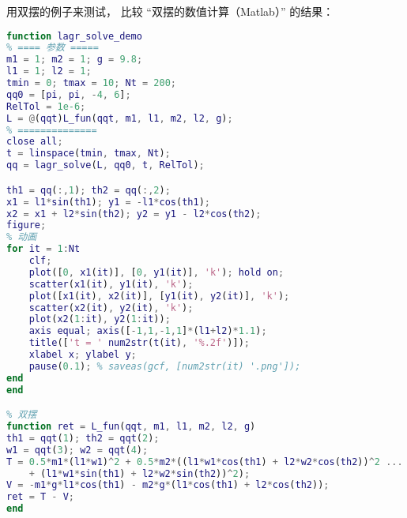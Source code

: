 用双摆的例子来测试， 比较 “双摆的数值计算（Matlab）” 的结果：
\begin{lstlisting}[language=matlab, caption=lagr\_solve\_demo.m]
% lagr_solve_demo
function lagr_solve_demo
% ==== 参数 =====
m1 = 1; m2 = 1; g = 9.8;
l1 = 1; l2 = 1;
tmin = 0; tmax = 10; Nt = 200;
qq0 = [pi, pi, -4, 6];
RelTol = 1e-6;
L = @(qqt)L_fun(qqt, m1, l1, m2, l2, g);
% ==============
close all;
t = linspace(tmin, tmax, Nt);
qq = lagr_solve(L, qq0, t, RelTol);

th1 = qq(:,1); th2 = qq(:,2);
x1 = l1*sin(th1); y1 = -l1*cos(th1);
x2 = x1 + l2*sin(th2); y2 = y1 - l2*cos(th2);
figure;
% 动画
for it = 1:Nt
    clf;
    plot([0, x1(it)], [0, y1(it)], 'k'); hold on;
    scatter(x1(it), y1(it), 'k');
    plot([x1(it), x2(it)], [y1(it), y2(it)], 'k');
    scatter(x2(it), y2(it), 'k');
    plot(x2(1:it), y2(1:it));
    axis equal; axis([-1,1,-1,1]*(l1+l2)*1.1);
    title(['t = ' num2str(t(it), '%.2f')]);
    xlabel x; ylabel y;
    pause(0.1); % saveas(gcf, [num2str(it) '.png']);
end
end

% 双摆
function ret = L_fun(qqt, m1, l1, m2, l2, g)
th1 = qqt(1); th2 = qqt(2);
w1 = qqt(3); w2 = qqt(4);
T = 0.5*m1*(l1*w1)^2 + 0.5*m2*((l1*w1*cos(th1) + l2*w2*cos(th2))^2 ...
    + (l1*w1*sin(th1) + l2*w2*sin(th2))^2);
V = -m1*g*l1*cos(th1) - m2*g*(l1*cos(th1) + l2*cos(th2));
ret = T - V;
end
\end{lstlisting}
